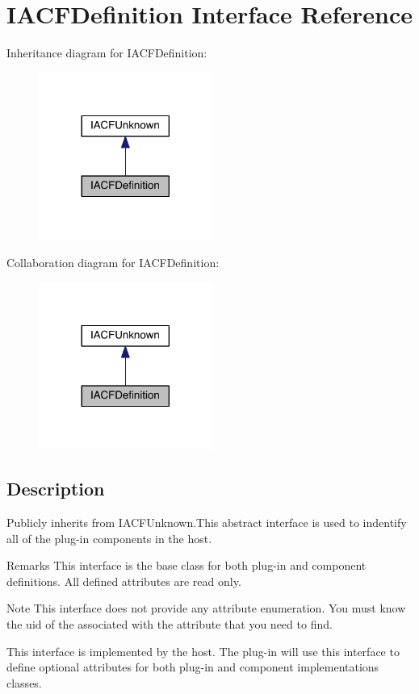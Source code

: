 \hypertarget{a00145}{}\section{I\+A\+C\+F\+Definition Interface Reference}
\label{a00145}


Inheritance diagram for I\+A\+C\+F\+Definition\+:
\nopagebreak
\begin{figure}[H]
\begin{center}
\leavevmode
\includegraphics[width=161pt]{a00725}
\end{center}
\end{figure}


Collaboration diagram for I\+A\+C\+F\+Definition\+:
\nopagebreak
\begin{figure}[H]
\begin{center}
\leavevmode
\includegraphics[width=161pt]{a00726}
\end{center}
\end{figure}


\subsection{Description}
Publicly inherits from I\+A\+C\+F\+Unknown.\+This abstract interface is used to indentify all of the plug-\/in components in the host. 

\begin{DoxyRemark}{Remarks}
This interface is the base class for both plug-\/in and component definitions. All defined attributes are read only.
\end{DoxyRemark}
\begin{DoxyNote}{Note}
This interface does not provide any attribute enumeration. You must know the uid of the associated with the attribute that you need to find. 

This interface is implemented by the host. The plug-\/in will use this interface to define optional attributes for both plug-\/in and component implementations classes. 
\end{DoxyNote}
